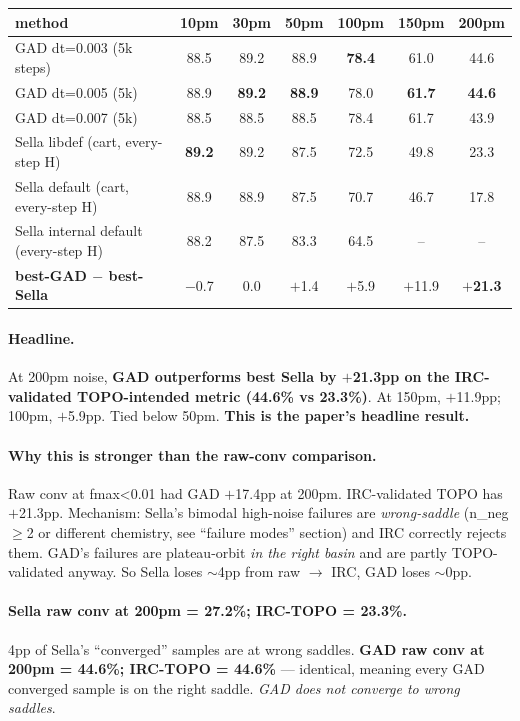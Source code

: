 \documentclass[11pt]{article}
\begin{document}
\begin{center}\small
\begin{tabular}{l|cccccc}
\toprule
method & 10pm & 30pm & 50pm & 100pm & 150pm & 200pm \\
\midrule
GAD dt=0.003 (5k steps)                & 88.5 & 89.2 & 88.9 & \textbf{78.4} & 61.0 & 44.6 \\
GAD dt=0.005 (5k)                      & 88.9 & \textbf{89.2} & \textbf{88.9} & 78.0 & \textbf{61.7} & \textbf{44.6} \\
GAD dt=0.007 (5k)                      & 88.5 & 88.5 & 88.5 & 78.4 & 61.7 & 43.9 \\
\midrule
Sella libdef (cart, every-step H)      & \textbf{89.2} & 89.2 & 87.5 & 72.5 & 49.8 & 23.3 \\
Sella default (cart, every-step H)     & 88.9 & 88.9 & 87.5 & 70.7 & 46.7 & 17.8 \\
Sella internal default (every-step H)  & 88.2 & 87.5 & 83.3 & 64.5 & --   & --   \\
\midrule
\textbf{best-GAD $-$ best-Sella}        & $-$0.7 & 0.0  & $+$1.4 & $+$5.9 & $+$11.9 & $+$\textbf{21.3} \\
\bottomrule
\end{tabular}
\end{center}

\paragraph{Headline.} At 200pm noise, \textbf{GAD outperforms best Sella by
$+$21.3pp on the IRC-validated TOPO-intended metric (44.6\% vs 23.3\%)}.
At 150pm, $+$11.9pp; 100pm, $+$5.9pp. Tied below 50pm. \textbf{This is the
paper's headline result.}

\paragraph{Why this is stronger than the raw-conv comparison.} Raw conv
at fmax<0.01 had GAD $+$17.4pp at 200pm. IRC-validated TOPO has $+$21.3pp.
Mechanism: Sella's bimodal high-noise failures are
\emph{wrong-saddle} (n\_neg$\ge$2 or different chemistry, see
``failure modes'' section) and IRC correctly rejects them. GAD's
failures are plateau-orbit \emph{in the right basin} and are partly
TOPO-validated anyway. So Sella loses $\sim$4pp from raw $\to$ IRC,
GAD loses $\sim$0pp.

\paragraph{Sella raw conv at 200pm = 27.2\%; IRC-TOPO = 23.3\%.} 4pp of
Sella's ``converged'' samples are at wrong saddles. \textbf{GAD raw conv
at 200pm = 44.6\%; IRC-TOPO = 44.6\%} — identical, meaning every GAD
converged sample is on the right saddle. \emph{GAD does not converge
to wrong saddles}.
\end{document}

